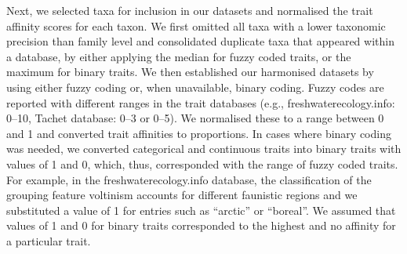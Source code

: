 \documentclass{article}
\begin{document}
Next, we selected taxa for inclusion in our datasets and normalised the trait affinity scores for each taxon. We first omitted all taxa with a lower taxonomic precision than family level and consolidated duplicate taxa that appeared within a database, by either applying the median for fuzzy coded traits, or the maximum for binary traits. We then established our harmonised datasets by using either fuzzy coding or, when unavailable, binary coding. Fuzzy codes are reported with different ranges in the trait databases (e.g., freshwaterecology.info: 0–10, Tachet database: 0–3 or 0–5). We normalised these to a range between 0 and 1 and converted trait affinities to proportions. In cases where binary coding was needed, we converted categorical and continuous traits into binary traits with values of 1 and 0, which, thus, corresponded with the range of fuzzy coded traits. For example, in the  freshwaterecology.info database, the classification of the grouping feature voltinism accounts for different faunistic regions and we substituted a value of 1 for entries such as “arctic” or “boreal”. We assumed that values of 1 and 0 for binary traits corresponded to the highest and no affinity for a particular trait.
\end{document}
